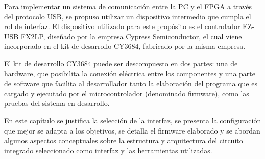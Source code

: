 Para implementar un sistema de comunicación entre la PC y el FPGA a través del protocolo USB, se propuso utilizar un dispositivo intermedio que cumpla el rol de interfaz. El dispositivo utilizado para este propósito es el controlador EZ-USB FX2LP, diseñado por la empresa Cypress Semiconductor, el cual viene incorporado en el kit de desarrollo CY3684, fabricado por la misma empresa.

El kit de desarrollo CY3684 puede ser descompuesto en dos partes: una de hardware, que posibilita la conexión eléctrica entre los componentes y una parte de software que facilita al desarrollador tanto la elaboración del programa que es cargado y ejecutado por el microcontrolador (denominado firmware), como las pruebas del sistema en desarrollo.

En este capítulo se justifica la selección de la interfaz, se presenta la configuración que mejor se adapta a los objetivos, se detalla el firmware elaborado y se abordan algunos aspectos conceptuales sobre la estructura y arquitectura del circuito integrado seleccionado como interfaz y las herramientas utilizadas.%



